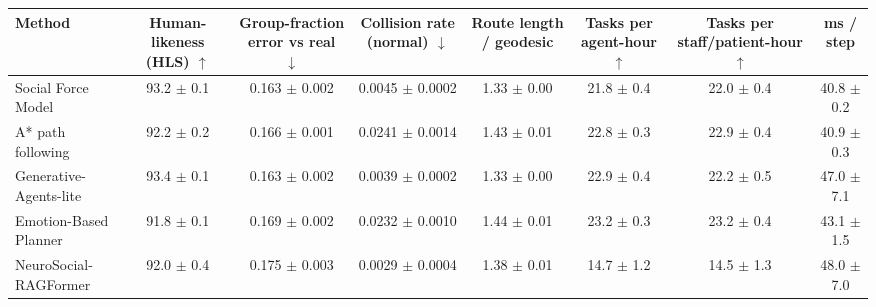 \begin{tabular}{lccccccc}\toprule
Method & Human-likeness (HLS) $\uparrow$ & Group-fraction error vs real $\downarrow$ & Collision rate (normal) $\downarrow$ & Route length / geodesic & Tasks per agent-hour $\uparrow$ & Tasks per staff/patient-hour $\uparrow$ & ms / step \\ \midrule
Social Force Model & 93.2 $\pm$ 0.1 & 0.163 $\pm$ 0.002 & 0.0045 $\pm$ 0.0002 & 1.33 $\pm$ 0.00 & 21.8 $\pm$ 0.4 & 22.0 $\pm$ 0.4 & 40.8 $\pm$ 0.2 \\
A* path following & 92.2 $\pm$ 0.2 & 0.166 $\pm$ 0.001 & 0.0241 $\pm$ 0.0014 & 1.43 $\pm$ 0.01 & 22.8 $\pm$ 0.3 & 22.9 $\pm$ 0.4 & 40.9 $\pm$ 0.3 \\
Generative-Agents-lite & 93.4 $\pm$ 0.1 & 0.163 $\pm$ 0.002 & 0.0039 $\pm$ 0.0002 & 1.33 $\pm$ 0.00 & 22.9 $\pm$ 0.4 & 22.2 $\pm$ 0.5 & 47.0 $\pm$ 7.1 \\
Emotion-Based Planner & 91.8 $\pm$ 0.1 & 0.169 $\pm$ 0.002 & 0.0232 $\pm$ 0.0010 & 1.44 $\pm$ 0.01 & 23.2 $\pm$ 0.3 & 23.2 $\pm$ 0.4 & 43.1 $\pm$ 1.5 \\
NeuroSocial-RAGFormer & 92.0 $\pm$ 0.4 & 0.175 $\pm$ 0.003 & 0.0029 $\pm$ 0.0004 & 1.38 $\pm$ 0.01 & 14.7 $\pm$ 1.2 & 14.5 $\pm$ 1.3 & 48.0 $\pm$ 7.0 \\
\bottomrule\end{tabular}
